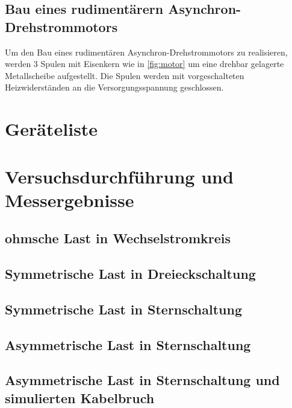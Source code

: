 \documentclass[12pt,english,ngerman]{scrartcl}
\begin{document}
\subsection{Bau eines rudimentärern Asynchron-Drehstrommotors}

Um den Bau eines rudimentären Asynchron-Drehstrommotors zu realisieren, werden 3 Spulen mit Eisenkern wie in 
\autoref{fig:motor} um eine drehbar gelagerte Metallscheibe aufgestellt. Die Spulen werden mit vorgeschalteten 
Heizwiderständen an die Versorgungsspannung geschlossen.




\section{Geräteliste}
\label{sec:geraeteliste}





\section{Versuchsdurchführung und Messergebnisse}
\label{sec:versuchsdurchfuehrung_messergebnisse}

\subsection{ohmsche Last in Wechselstromkreis}


\subsection{Symmetrische Last in Dreieckschaltung}


\subsection{Symmetrische Last in Sternschaltung}


\subsection{Asymmetrische Last in Sternschaltung}


\subsection{Asymmetrische Last in Sternschaltung und simulierten Kabelbruch}
\end{document}
